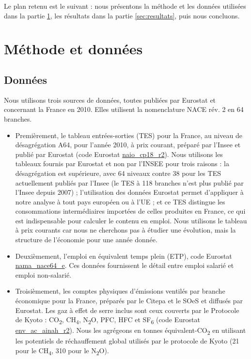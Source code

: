 Le plan retenu est le suivant : nous présentons la méthode et les données utilisées dans la partie  \ref{sec:methode_donnees}, les résultats dans la partie \ref{sec:resultats}, puis nous concluons.


\section{Méthode et données}
\label{sec:methode_donnees}

\subsection{Données}
Nous utilisons trois sources de données, toutes publiées par Eurostat et concernant la France en 2010. Elles utilisent la nomenclature NACE rév. 2 en 64 branches.
\begin{itemize}
	\item Premièrement, le tableau entrées-sorties (TES) pour la France, au niveau de désagrégation A64, pour l’année 2010, à prix courant, préparé par l’Insee et publié par Eurostat (code Eurostat \href{http://appsso.eurostat.ec.europa.eu/nui/show.do?dataset=naio_cp18_r2&lang=en}{naio\_cp18\_r2}). Nous utilisons les tableaux fournis par Eurostat et non par l’INSEE pour trois raisons : la désagrégation est supérieure, avec 64 niveaux contre 38 pour les TES actuellement publiés par l’Insee (le TES à 118 branches n’est plus publié par l’Insee depuis 2007) ; l’utilisation des données Eurostat permet d’appliquer à notre analyse à tout pays européen ou à l’UE ; et ce TES distingue les consommations intermédiaires importées de celles produites en France, ce qui est indispensable pour calculer le contenu en emploi. Nous utilisons le tableau à prix courants car nous ne cherchons pas à étudier une évolution, mais la structure de l’économie pour une année donnée.
	\item Deuxièmement, l’emploi en équivalent temps plein (ETP), code Eurostat \href{http://appsso.eurostat.ec.europa.eu/nui/show.do?dataset=nama_nace64_e&lang=en}{nama\_nace64\_e}. Ces données fournissent le détail entre emploi salarié et emploi non-salarié. 
	\item Troisièmement, les comptes physiques d’émissions ventilés par branche économique pour la France, préparés par le Citepa et le SOeS et diffusés par Eurostat. Les gaz à effet de serre inclus sont ceux couverts par le Protocole de Kyoto : CO\textsubscript{2}, CH\textsubscript{4}, N\textsubscript{2}O, PFC, HFC et SF\textsubscript{6} (code Eurostat \href{http://appsso.eurostat.ec.europa.eu/nui/show.do?dataset=env_ac_ainah_r2&lang=en}{env\_ac\_ainah\_r2}). Nous les agrégeons en tonnes équivalent-CO\textsubscript{2} en utilisant les potentiels de réchauffement global utilisés par le protocole de Kyoto (21 pour le CH\textsubscript{4}, 310 pour le N\textsubscript{2}O). 
\end{itemize} 
